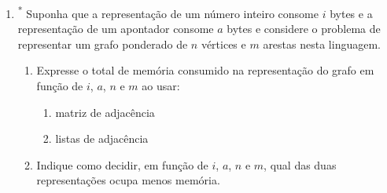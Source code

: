 \begin{enumerate}[label=\textbf{\arabic*.}, ref=\arabic*, resume]
    \item\textsuperscript{*} Suponha que a representação de um número inteiro consome $i$ bytes e a representação de um apontador consome $a$ bytes e considere o problema de representar um grafo ponderado de $n$ vértices e $m$ arestas nesta linguagem. 
    \begin{enumerate}
        \item Expresse o total de memória consumido na representação do grafo em função de $i$, $a$, $n$ e $m$ ao usar: 
        \begin{enumerate}
            \item matriz de adjacência 
            \item listas de adjacência 
        \end{enumerate}
        \item Indique como decidir, em função de $i$, $a$, $n$ e $m$, qual das duas representações ocupa menos memória. 
    \end{enumerate}
\end{enumerate}